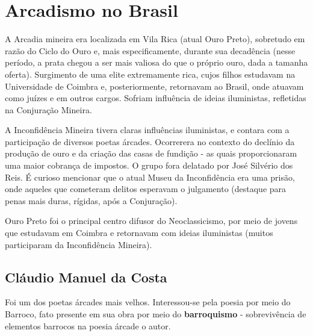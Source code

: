 
\chapter{Arcadismo no Brasil}

A Arcadia mineira era localizada em Vila Rica (atual Ouro Preto), sobretudo em razão do Ciclo do Ouro e, mais especificamente, durante sua decadência (nesse período, a prata chegou a ser mais valiosa do que o próprio ouro, dada a tamanha oferta). Surgimento de uma elite extremamente rica, cujos filhos estudavam na Universidade de Coimbra e, posteriormente, retornavam ao Brasil, onde atuavam como juízes e em outros cargos. Sofriam influência de ideias iluministas, refletidas na Conjuração Mineira.

A Inconfidência Mineira tivera claras influências iluministas, e contara com a participação de diversos poetas árcades. Ocorrerera no contexto do declínio da produção de ouro e da criação das casas de fundição - as quais proporcionaram uma maior cobrança de impostos. O grupo fora delatado por José Silvério dos Reis. É curioso mencionar que o atual Museu da Inconfidência era uma prisão, onde aqueles que cometeram delitos esperavam o julgamento (destaque para penas mais duras, rígidas, após a Conjuração).

Ouro Preto foi o principal centro difusor do Neoclassicismo, por meio de jovens que estudavam em Coimbra e retornavam com ideias iluministas (muitos participaram da Inconfidência Mineira).

\section{Cláudio Manuel da Costa}

Foi um dos poetas árcades mais velhos. Interessou-se pela poesia por meio do Barroco, fato presente em sua obra por meio do \textbf{barroquismo} - sobrevivência de elementos barrocos na poesia árcade o autor.

